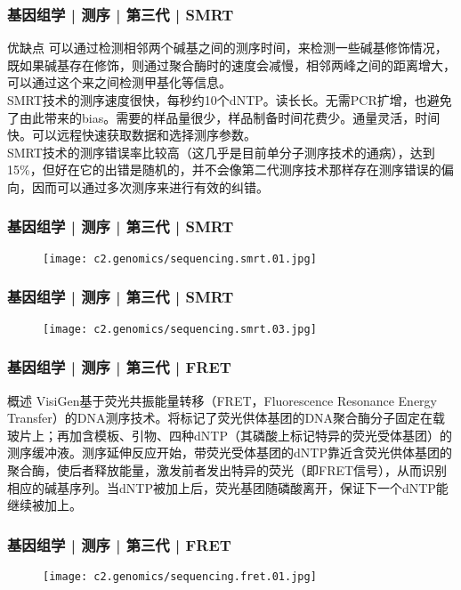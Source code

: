 \begin{frame}
  \frametitle{基因组学 | 测序 | 第三代 | SMRT}
  \begin{block}{优缺点}
可以通过检测相邻两个碱基之间的测序时间，来检测一些碱基修饰情况，既如果碱基存在修饰，则通过聚合酶时的速度会减慢，相邻两峰之间的距离增大，可以通过这个来之间检测甲基化等信息。\\
\vspace{1em}
SMRT技术的测序速度很快，每秒约10个dNTP。读长长。无需PCR扩增，也避免了由此带来的bias。需要的样品量很少，样品制备时间花费少。通量灵活，时间快。可以远程快速获取数据和选择测序参数。\\
\vspace{1em}
SMRT技术的测序错误率比较高（这几乎是目前单分子测序技术的通病），达到15\%，但好在它的出错是随机的，并不会像第二代测序技术那样存在测序错误的偏向，因而可以通过多次测序来进行有效的纠错。
  \end{block}
\end{frame}

\begin{frame}
  \frametitle{基因组学 | 测序 | 第三代 | SMRT}
  \begin{figure}
    \centering
    \texttt{[image: c2.genomics/sequencing.smrt.01.jpg]}
  \end{figure}
\end{frame}

\begin{frame}
  \frametitle{基因组学 | 测序 | 第三代 | SMRT}
  \begin{figure}
    \centering
    \texttt{[image: c2.genomics/sequencing.smrt.03.jpg]}
  \end{figure}
\end{frame}

\begin{frame}
  \frametitle{基因组学 | 测序 | 第三代 | FRET}
  \begin{block}{概述}
VisiGen基于荧光共振能量转移（FRET，Fluorescence Resonance Energy Transfer）的DNA测序技术。将标记了荧光供体基团的DNA聚合酶分子固定在载玻片上；再加含模板、引物、四种dNTP（其磷酸上标记特异的荧光受体基团）的测序缓冲液。测序延伸反应开始，带荧光受体基团的dNTP靠近含荧光供体基团的聚合酶，使后者释放能量，激发前者发出特异的荧光（即FRET信号），从而识别相应的碱基序列。当dNTP被加上后，荧光基团随磷酸离开，保证下一个dNTP能继续被加上。
  \end{block}
\end{frame}

\begin{frame}
  \frametitle{基因组学 | 测序 | 第三代 | FRET}
  \begin{figure}
    \centering
    \texttt{[image: c2.genomics/sequencing.fret.01.jpg]}
  \end{figure}
\end{frame}

